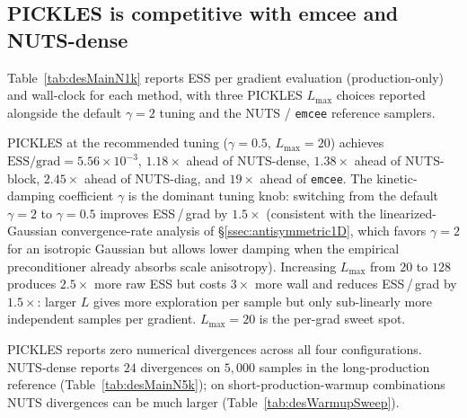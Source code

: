\documentclass{article}
\begin{document}
\subsection{PICKLES is competitive with emcee and NUTS-dense}\label{ssec:desMain}

Table~\ref{tab:desMainN1k} reports ESS per gradient evaluation
(production-only) and wall-clock for each method, with three PICKLES
$L_{\max}$ choices reported alongside the default $\gamma=2$ tuning
and the NUTS / \texttt{emcee} reference samplers.

PICKLES at the recommended tuning ($\gamma=0.5$, $L_{\max}=20$)
achieves $\text{ESS}/\text{grad}\!=\!5.56\!\times\!10^{-3}$,
$1.18\!\times$ ahead of NUTS-dense, $1.38\!\times$ ahead of NUTS-block,
$2.45\!\times$ ahead of NUTS-diag, and $19\!\times$ ahead of
\texttt{emcee}. The kinetic-damping coefficient $\gamma$ is the
dominant tuning knob: switching from the default $\gamma=2$ to
$\gamma=0.5$ improves ESS\,/\,grad by $1.5\!\times$
(consistent with the linearized-Gaussian convergence-rate analysis of
\S\ref{ssec:antisymmetric1D}, which favors $\gamma=2$ for an
isotropic Gaussian but allows lower damping when the empirical
preconditioner already absorbs scale anisotropy). Increasing $L_{\max}$
from $20$ to $128$ produces $2.5\!\times$ more raw ESS but costs
$3\!\times$ more wall and reduces ESS\,/\,grad by $1.5\!\times$:
larger $L$ gives more exploration per sample but only sub-linearly
more independent samples per gradient. $L_{\max}=20$ is the per-grad
sweet spot.

PICKLES reports zero numerical divergences across all four configurations.
NUTS-dense reports $24$ divergences on $5{,}000$ samples in the
long-production reference (Table~\ref{tab:desMainN5k}); on
short-production-warmup combinations NUTS divergences can be much
larger (Table~\ref{tab:desWarmupSweep}).
\end{document}
